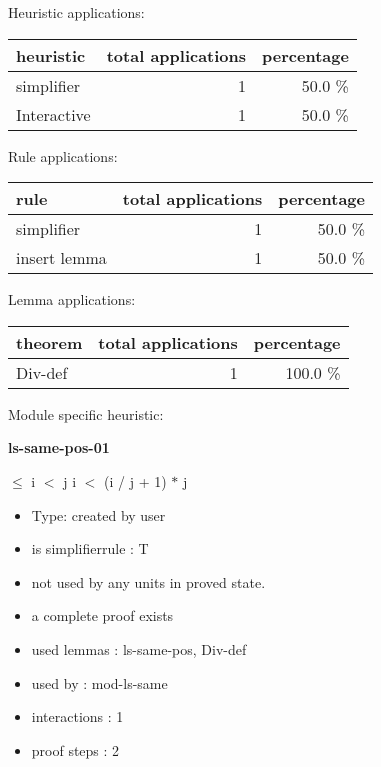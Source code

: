 \documentclass[a4paper]{article}
\begin{document}
\medskip


Heuristic applications:

\begin{supertabular}{l|r|r}
heuristic	& total applications & percentage \\ \hline
simplifier & 1 & 50.0 \% \\
Interactive & 1 & 50.0 \% \\

\end{supertabular}

Rule applications:

\begin{supertabular}{l|r|r}
rule	        & total applications & percentage \\ \hline
simplifier & 1 & 50.0 \% \\
insert lemma & 1 & 50.0 \% \\

\end{supertabular}

Lemma applications:

\begin{supertabular}{l|r|r}
theorem	        & total applications & percentage \\ \hline
Div-def & 1 & 100.0 \% \\

\end{supertabular}

Module specific heuristic:

\pagebreak

{\LARGE\bf ls-same-pos-01}\label{lemma-ls-same-pos-01}

\medskip

  $\le$ i  $<$ j \Imp i $<$ (i / j + 1) $*$ j

\begin{itemize}

\item Type: created by user

\item is simplifierrule : T
\item not used by any units in proved state.
\item       a complete proof exists
\item       used lemmas  : ls-same-pos, Div-def
\item       used by      : mod-ls-same
\item       interactions : 1
\item       proof steps  : 2
\end{itemize}
\end{document}
